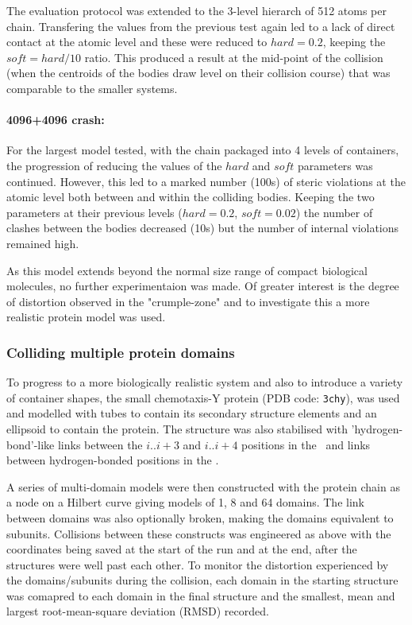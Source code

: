 The evaluation protocol was extended to the 3-level hierarch of 512 atoms per chain.
Transfering the values from the previous test again led to a lack of direct contact at the
atomic level and these were reduced to $hard = 0.2$, keeping the $soft = hard/10$ ratio.
This produced a result at the mid-point of the collision (when the centroids of the bodies
draw level on their collision course) that was comparable to the smaller systems.

\paragraph{4096+4096 crash:\\}

For the largest model tested, with the chain packaged into 4 levels of containers,  the
progression of reducing the values of the $hard$ and $soft$ parameters was continued.
However, this led to a marked number (100s) of steric violations at the atomic level both
between and within the colliding bodies.   Keeping the two parameters at their previous
levels ($hard = 0.2$, $soft = 0.02$) the number of clashes between the bodies decreased
(10s) but the number of internal violations remained high.

As this model extends beyond the normal size range of compact biological molecules,
no further experimentaion was made.   Of greater interest is the degree of distortion 
observed in the "crumple-zone" and to investigate this a more realistic protein model
was used.


\subsubsection{Colliding multiple protein domains}

To progress to a more biologically realistic system and also to introduce a variety
of container shapes, the small chemotaxis-Y protein (PDB code: {\tt 3chy}), was used
and modelled with tubes to contain its secondary structure elements and an ellipsoid
to contain the protein.    The structure was also stabilised with 'hydrogen-bond'-like
links between the $i..i+3$ and $i..i+4$ positions in the \AHs\ and links between
hydrogen-bonded positions in the \BS.

A series of multi-domain models were then constructed with the protein chain as a
node on a Hilbert curve giving models of 1, 8 and 64 domains.   The link between 
domains was also optionally broken, making the domains equivalent to subunits.
Collisions between these constructs was engineered as above with the coordinates
being saved at the start of the run and at the end, after the structures were well
past each other.    To monitor the distortion experienced by the domains/subunits
during the collision, each domain in the starting structure was comapred to each
domain in the final structure and the smallest, mean and largest root-mean-square
deviation (RMSD) recorded. 

